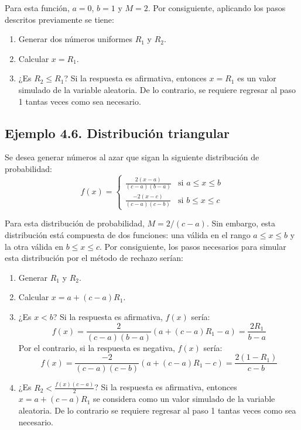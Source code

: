 \documentclass[11pt,letterpaper]{report}
\begin{document}
Para esta función, $a = 0$, $b = 1$ y $M = 2$. Por consiguiente, aplicando los pasos descritos previamente se tiene:
\begin{enumerate}
    \item Generar dos números uniformes $R_1$ y $R_2$.
    \item Calcular $x = R_1$.
    \item ¿Es $R_2 \le R_1$? Si la respuesta es afirmativa, entonces $x = R_1$ es un valor simulado de la variable aleatoria. De lo contrario, se requiere regresar al paso 1 tantas veces como sea necesario.
\end{enumerate}

\subsection*{Ejemplo 4.6. Distribución triangular}
Se desea generar números al azar que sigan la siguiente distribución de probabilidad:
\begin{equation}
f(x) = \begin{cases} 
\frac{2(x - a)}{(c - a)(b - a)} & \text{si } a \le x \le b \\[2ex]
\frac{-2(x - c)}{(c - a)(c - b)} & \text{si } b \le x \le c 
\end{cases}
\end{equation}

Para esta distribución de probabilidad, $M = 2/(c - a)$. Sin embargo, esta distribución está compuesta de dos funciones: una válida en el rango $a \le x \le b$ y la otra válida en $b \le x \le c$. Por consiguiente, los pasos necesarios para simular esta distribución por el método de rechazo serían:

\begin{enumerate}
    \item Generar $R_1$ y $R_2$.
    \item Calcular $x = a + (c - a)R_1$.
    \item ¿Es $x < b$? Si la respuesta es afirmativa, $f(x)$ sería:
    \begin{equation}
    f(x) = \frac{2}{(c - a)(b - a)}(a + (c - a)R_1 - a) = \frac{2R_1}{b - a}
    \end{equation}
    Por el contrario, si la respuesta es negativa, $f(x)$ sería:
    \begin{equation}
    f(x) = \frac{-2}{(c - a)(c - b)}(a + (c - a)R_1 - c) = \frac{2(1 - R_1)}{c - b}
    \end{equation}
    \item ¿Es $R_2 < \frac{f(x)(c - a)}{2}$? Si la respuesta es afirmativa, entonces $x = a + (c - a)R_1$ se considera como un valor simulado de la variable aleatoria. De lo contrario se requiere regresar al paso 1 tantas veces como sea necesario.
\end{enumerate}
\end{document}
